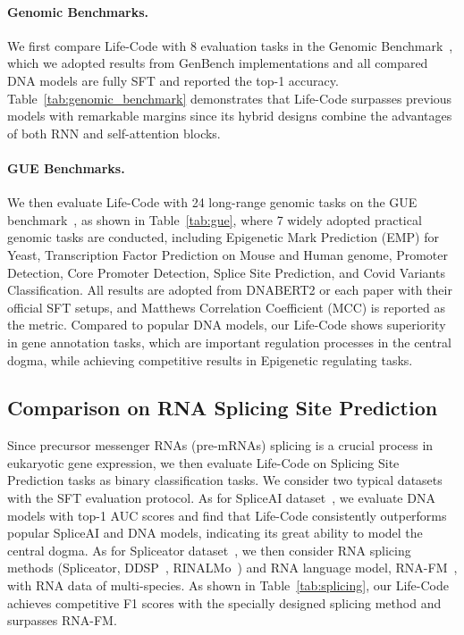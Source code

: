 \vspace{-0.5em}
\paragraph{Genomic Benchmarks.}
We first compare Life-Code with 8 evaluation tasks in the Genomic Benchmark~\citep{BMC2023genomicbenchmark}, which we adopted results from GenBench implementations \citep{liu2024genbench} and all compared DNA models are fully SFT and reported the top-1 accuracy. Table~\ref{tab:genomic_benchmark} demonstrates that Life-Code surpasses previous models with remarkable margins since its hybrid designs combine the advantages of both RNN and self-attention blocks.

\vspace{-0.5em}
\paragraph{GUE Benchmarks.}
We then evaluate Life-Code with 24 long-range genomic tasks on the GUE benchmark~\citep{iclr2024dnabert2}, as shown in Table~\ref{tab:gue}, where 7 widely adopted practical genomic tasks are conducted, including Epigenetic Mark Prediction (EMP) for Yeast, Transcription Factor Prediction on Mouse and Human genome, Promoter Detection, Core Promoter Detection, Splice Site Prediction, and Covid Variants Classification. All results are adopted from DNABERT2 or each paper with their official SFT setups, and Matthews Correlation Coefficient (MCC) is reported as the metric. Compared to popular DNA models, our Life-Code shows superiority in gene annotation tasks, which are important regulation processes in the central dogma, while achieving competitive results in Epigenetic regulating tasks.




\subsection{Comparison on RNA Splicing Site Prediction}
\label{sec:rna_comparison}
Since precursor messenger RNAs (pre-mRNAs) splicing is a crucial process in eukaryotic gene expression, we then evaluate Life-Code on Splicing Site Prediction tasks as binary classification tasks. We consider two typical datasets with the SFT evaluation protocol.
As for SpliceAI dataset~\citep{JAGANATHAN2019SpliceAI}, we evaluate DNA models with top-1 AUC scores and find that Life-Code consistently outperforms popular SpliceAI and DNA models, indicating its great ability to model the central dogma. As for Spliceator dataset~\citep{BMC2021spliceator}, we then consider RNA splicing methods (Spliceator, DDSP~\citep{naito2019DDSP}, RINALMo~\citep{Penic2024RiNALMo}) and RNA language model, RNA-FM~\citep{shen2024rnafm}, with RNA data of multi-species. As shown in Table~\ref{tab:splicing}, our Life-Code achieves competitive F1 scores with the specially designed splicing method and surpasses RNA-FM.


